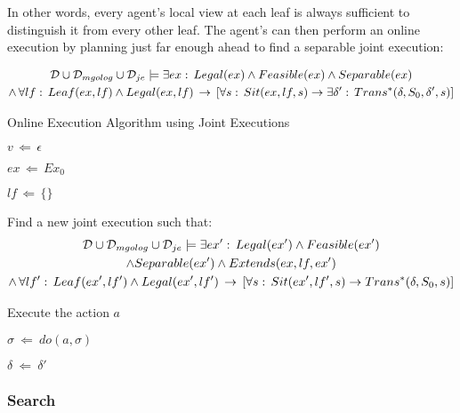 In other words, every agent's local view at each leaf is always sufficient
to distinguish it from every other leaf. The agent's can then perform
an online execution by planning just far enough ahead to find a separable
joint execution:

\begin{multline*}
\mathcal{D}\cup\mathcal{D}_{mgolog}\cup\mathcal{D}_{je}\models\exists ex:\, Legal(ex)\wedge Feasible(ex)\wedge Separable(ex)\\
\wedge\,\forall lf:\, Leaf(ex,lf)\wedge Legal(ex,lf)\,\rightarrow\,\left[\forall s:\, Sit(ex,lf,s)\rightarrow\exists\delta':\, Trans^{*}(\delta,S_{0},\delta',s)\right]\end{multline*}


%
\begin{algorithm}[t]
 

\caption{Online Execution Algorithm using Joint Executions}


\label{alg:indigolog_exec} \begin{algorithmic}

\STATE $v\,\Leftarrow\,\epsilon$

\STATE $ex\,\Leftarrow\, Ex_{0}$

\STATE $lf\,\Leftarrow\,\{\}$


\STATE Find a new joint execution such that:\begin{multline*}
\mathcal{D}\cup\mathcal{D}_{mgolog}\cup\mathcal{D}_{je}\models\exists ex':\, Legal(ex')\wedge Feasible(ex')\\
\wedge Separable(ex')\wedge Extends(ex,lf,ex')\\
\wedge\,\forall lf':\, Leaf(ex',lf')\wedge Legal(ex',lf')\,\rightarrow\,\left[\forall s:\, Sit(ex',lf',s)\rightarrow Trans^{*}(\delta,S_{0},s)\right]\end{multline*}


\STATE Execute the action $a$

\STATE $\sigma\ \Leftarrow\ do(a,\sigma)$

\STATE $\delta\ \Leftarrow\ \delta'$

\ENDWHILE

\end{algorithmic} 
\end{algorithm}



\subsubsection{Search}

